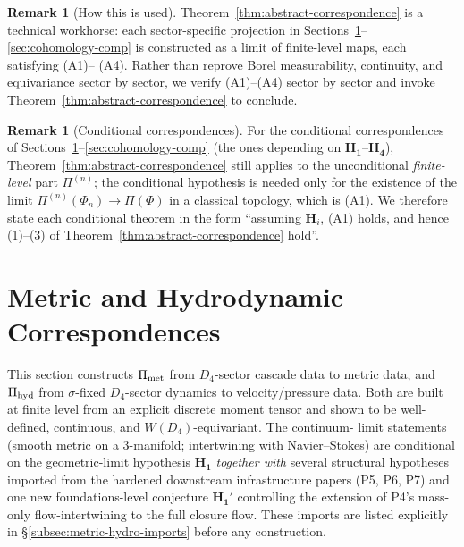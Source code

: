 \documentclass[11pt, a4paper]{amsart}
\theoremstyle{definition}
\newtheorem{remark}[theorem]{Remark}
\newcommand{\met}{{\rm met}}
\newcommand{\hyd}{{\rm hyd}}
\begin{document}
\begin{remark}[How this is used]
Theorem~\ref{thm:abstract-correspondence} is a technical workhorse:
each sector-specific projection in
Sections~\ref{sec:metric-hydro}--\ref{sec:cohomology-comp} is
constructed as a limit of finite-level maps, each satisfying (A1)--
(A4). Rather than reprove Borel measurability, continuity, and
equivariance sector by sector, we verify (A1)--(A4) sector by
sector and invoke
Theorem~\ref{thm:abstract-correspondence} to conclude.
\end{remark}

\begin{remark}[Conditional correspondences]
For the conditional correspondences of
Sections~\ref{sec:metric-hydro}--\ref{sec:cohomology-comp} (the
ones depending on $\mathbf{H_1}$--$\mathbf{H_4}$),
Theorem~\ref{thm:abstract-correspondence} still applies to the
unconditional \emph{finite-level} part $\Pi^{(n)}$; the conditional
hypothesis is needed only for the existence of the limit
$\Pi^{(n)}(\Phi_n) \to \Pi(\Phi)$ in a classical topology, which
is (A1). We therefore state each conditional theorem in the form
``assuming $\mathbf{H}_i$, (A1) holds, and hence (1)--(3) of
Theorem~\ref{thm:abstract-correspondence} hold''.
\end{remark}

\section{Metric and Hydrodynamic Correspondences}
\label{sec:metric-hydro}

This section constructs $\Pi_{\met}$ from $D_4$-sector cascade data
to metric data, and $\Pi_{\hyd}$ from $\sigma$-fixed $D_4$-sector
dynamics to velocity/pressure data. Both are built at finite level
from an explicit discrete moment tensor and shown to be
well-defined, continuous, and $W(D_4)$-equivariant. The continuum-
limit statements (smooth metric on a $3$-manifold; intertwining
with Navier--Stokes) are conditional on the geometric-limit
hypothesis $\mathbf{H_1}$ \emph{together with} several structural
hypotheses imported from the hardened downstream infrastructure
papers (P5, P6, P7) and one new foundations-level conjecture
$\mathbf{H_1'}$ controlling the extension of P4's mass-only
flow-intertwining to the full closure flow. These imports are
listed explicitly in \S\ref{subsec:metric-hydro-imports} before
any construction.
\end{document}
